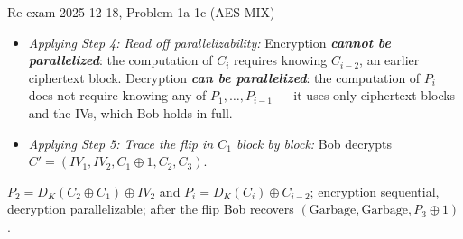 \documentclass[12pt, a4paper]{article}
\newcommand{\term}[1]{\textbf{\textit{#1}}}        %
\begin{document}
\begin{practicebox}{Re-exam 2025-12-18, Problem 1a-1c (AES-MIX)}
\begin{itemize}
\[
C_i = E_K(C_{i-2} \oplus P_i)
\]

\[
D_K(C_i) = C_{i-2} \oplus P_i
\]

\[
P_i = D_K(C_i) \oplus C_{i-2}.
\]

(Also $P_1 = D_K(C_1) \oplus IV_1$ from the first equation, useful in part (c).)
    \item \textit{Applying Step 4: Read off parallelizability:} Encryption \term{cannot be parallelized}: the computation of $C_i$ requires knowing $C_{i-2}$, an earlier ciphertext block.
    Decryption \term{can be parallelized}: the computation of $P_i$ does not require knowing any of $P_1, \dots, P_{i-1}$ --- it uses only ciphertext blocks and the IVs, which Bob holds in full.
    \item \textit{Applying Step 5: Trace the flip in $C_1$ block by block:} Bob decrypts $C' = (IV_1, IV_2, C_1 \oplus 1, C_2, C_3)$.
\end{itemize}

\begin{answerbox}
$P_2 = D_K(C_2 \oplus C_1) \oplus IV_2$ and $P_i = D_K(C_i) \oplus C_{i-2}$; encryption sequential, decryption parallelizable; after the flip Bob recovers $(\text{Garbage}, \text{Garbage}, P_3 \oplus 1)$.
\end{answerbox}
\end{practicebox}
\end{document}
